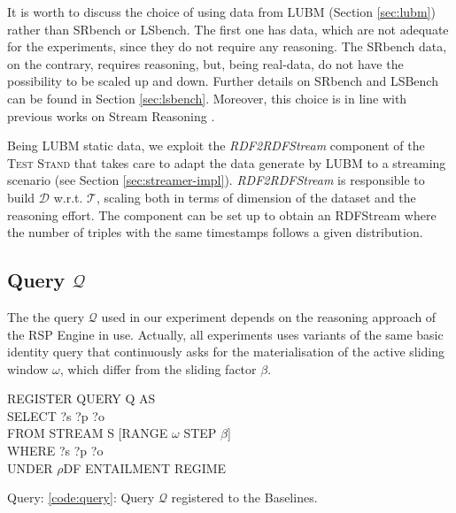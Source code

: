It is worth to discuss the choice of using data from LUBM (Section \ref{sec:lubm}) rather than SRbench or LSbench. The first one has data, which are not adequate for the experiments, since they do not require any reasoning. The SRbench data, on the contrary, requires reasoning, but, being real-data, do not have the possibility to be scaled up and down. Further details on SRbench and LSBench can be found in Section \ref{sec:lsbench}. Moreover, this choice is in line with previous works on Stream Reasoning \cite{DBLP:conf/semweb/UrbaniMJHB13}. 

Being LUBM static data, we exploit the \textit{RDF2RDFStream} component of the \textsc{Test Stand} that takes care to adapt the data generate by LUBM to a streaming scenario (see Section \ref{sec:streamer-impl}). \textit{RDF2RDFStream} is responsible to build $\mathcal{D}$ w.r.t. $\mathcal{T}$, scaling both in terms of dimension of the dataset and the reasoning effort. The component can be set up to obtain an RDFStream where the number of triples with the same timestamps follows a given distribution. %

\subsection{Query $\mathcal{Q}$}\label{sec:query}
 
The the query $\mathcal{Q}$ used in our experiment depends on the reasoning approach of the RSP Engine in use. Actually, all  experiments uses variants of the same basic identity query that continuously asks for the materialisation of the active sliding window $\omega$, which differ from the sliding factor $\beta$.\\

\begin{center}
\raggedright
REGISTER QUERY Q AS \\
SELECT ?s ?p ?o \\
FROM STREAM S [RANGE $\omega$ STEP $\beta$]\\
WHERE {?s ?p ?o}\\
UNDER $\rho$DF ENTAILMENT REGIME
\label{code:query}

\end{center}
Query: \ref{code:query}: Query $\mathcal{Q}$ registered to the \name Baselines.\\


